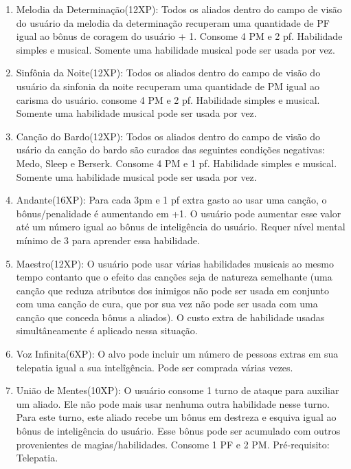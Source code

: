 \begin{enumerate}
		\item Melodia da Determinação(12XP): Todos os aliados dentro do campo de visão do usuário da melodia da determinação recuperam uma quantidade de PF igual ao bônus de coragem do usuário + 1. Consome 4 PM e 2 pf. Habilidade simples e musical. Somente uma habilidade musical pode ser usada por vez.
		
		\item Sinfônia da Noite(12XP): Todos os aliados dentro do campo de visão do usuário da sinfonia da noite recuperam uma quantidade de PM igual ao carisma do usuário. consome 4 PM e 2 pf. Habilidade simples e musical. Somente uma habilidade musical pode ser usada por vez.
			
		\item Canção do Bardo(12XP): Todos os aliados dentro do campo de visão do usário da canção do bardo são curados das seguintes condições negativas: Medo, Sleep e Berserk. Consome 4 PM e 1 pf. Habilidade simples e musical. Somente uma habilidade musical pode ser usada por vez.	
		
		\item Andante(16XP): Para cada 3pm e 1 pf extra gasto ao usar uma canção, o bônus/penalidade é aumentando em +1. O usuário pode aumentar esse valor até um número igual ao bônus de inteligência do usuário. Requer nível mental mínimo de 3 para aprender essa habilidade.
				
		\item Maestro(12XP): O usuário pode usar várias habilidades musicais ao mesmo tempo contanto que o efeito das canções seja de natureza semelhante (uma canção que reduza atributos dos inimigos não pode ser usada em conjunto com uma canção de cura, que por sua vez não pode ser usada com uma canção que conceda bônus a aliados). O custo extra de habilidade usadas simultâneamente é aplicado nessa situação.		 
		 
		\item Voz Infinita(6XP): O alvo pode incluir um número de pessoas extras em sua telepatia igual a sua intelîgência. Pode ser comprada várias vezes.
		
		\item União de Mentes(10XP): O usuário consome 1 turno de ataque para auxiliar um aliado. Ele não pode mais usar nenhuma outra habilidade nesse turno. Para este turno, este aliado recebe um bônus em destreza e esquiva igual ao bônus de inteligência do usuário. Esse bônus pode ser acumulado com outros provenientes de magias/habilidades. Consome 1 PF e 2 PM. Pré-requisito: Telepatia.
	

\end{enumerate}
